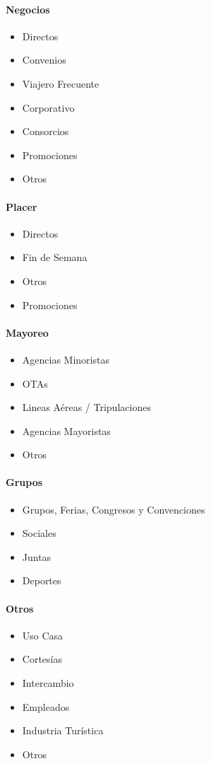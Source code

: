 \documentclass[a4paper,11pt]{article}
\begin{document}
\paragraph{\textbf{Negocios}}
\begin{itemize}[noitemsep]
\item Directos
\item Convenios
\item Viajero Frecuente
\item Corporativo
\item Consorcios
\item Promociones
\item Otros
\end{itemize}
\paragraph{\textbf{Placer}}
\begin{itemize}[noitemsep]
\item Directos
\item Fin de Semana
\item Otros
\item Promociones
\end{itemize}
\paragraph{\textbf{Mayoreo}}
\begin{itemize}[noitemsep]
\item Agencias Minoristas
\item OTAs
\item Lineas Aéreas / Tripulaciones
\item Agencias Mayoristas
\item Otros
\end{itemize}
\paragraph{\textbf{Grupos}}
\begin{itemize}[noitemsep]
\item Grupos, Ferias, Congresos y Convenciones
\item Sociales
\item Juntas
\item Deportes
\end{itemize}
\paragraph{\textbf{Otros}}
\begin{itemize}[noitemsep]
\item Uso Casa
\item Cortesías
\item Intercambio
\item Empleados
\item Industria Turística
\item Otros
\end{itemize}
\end{document}
